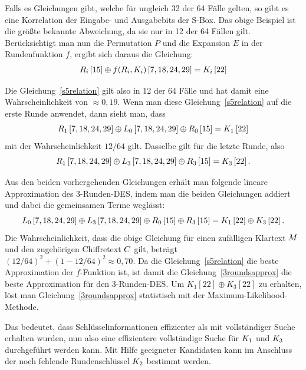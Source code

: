 Falls es Gleichungen gibt, welche für ungleich 32 der 64 Fälle gelten, so gibt es eine Korrelation der Eingabe- und Ausgabebits der S-Box. Das obige Beispiel ist die größte bekannte Abweichung, da sie nur in 12 der 64 Fällen gilt. Berücksichtigt man nun die Permutation $P$ und die Expansion $E$ in der Rundenfunktion $f$, ergibt sich daraus die Gleichung:
\begin{equation}
	R_i\left[ 15\right] \oplus f(R_i,K_i)\left[ 7,18,24,29\right] = K_i\left[ 22\right]
	\label{s5relation}
\end{equation}

Die Gleichung~\ref{s5relation} gilt also in 12 der 64 Fälle und hat damit eine Wahrscheinlichkeit von $\approx 0,19$. Wenn man diese Gleichung~\ref{s5relation}
auf die erste Runde anwendet, dann sieht man, dass
\begin{equation}
	R_1\left[ 7,18,24,29\right] \oplus L_0\left[ 7,18,24,29\right] \oplus R_0\left[ 15 \right] = K_1 \left[ 22 \right]
\end{equation}
mit der Wahrscheinlichkeit $12/64$ gilt. Dasselbe gilt für die letzte Runde, also
\begin{equation}
	R_1\left[ 7,18,24,29\right] \oplus L_3\left[ 7,18,24,29\right] \oplus R_3\left[ 15 \right] = K_3 \left[ 22 \right].
\end{equation}

Aus den beiden vorhergehenden Gleichungen erhält man folgende lineare Approximation des 3-Runden-DES, indem man die beiden Gleichungen addiert und dabei die gemeinsamen Terme weglässt:
\begin{equation}
	L_0\left[ 7,18,24,29\right] \oplus L_3\left[ 7,18,24,29\right] \oplus R_0\left[ 15 \right] \oplus R_3\left[ 15 \right] = K_1 \left[ 22 \right] \oplus K_3\left[ 22 \right].
	\label{3roundsapprox}
\end{equation}
Die Wahrscheinlichkeit, dass die obige Gleichung für einen zufälligen Klartext $M$ und den zugehörigen Chiffretext $C$ gilt, beträgt
$(12/64)^2+(1-12/64)^2 \approx 0,70$. Da die Gleichung~\ref{s5relation} die beste Approximation der $f$-Funktion ist, ist damit die
Gleichung~\ref{3roundsapprox} die beste Approximation für den 3-Runden-DES. Um $K_1\left[ 22\right] \oplus K_3\left[ 22\right]$
zu erhalten, löst man Gleichung~\ref{3roundsapprox} statistisch mit der Maximum-Likelihood-Methode.

Das bedeutet, dass Schlüsselinformationen effizienter als mit vollständiger Suche erhalten wurden, nun also eine effizientere vollständige Suche für $K_1$ und $K_3$
durchgeführt werden kann. Mit Hilfe geeigneter Kandidaten kann im Anschluss der noch fehlende Rundenschlüssel $K_2$ bestimmt werden.


